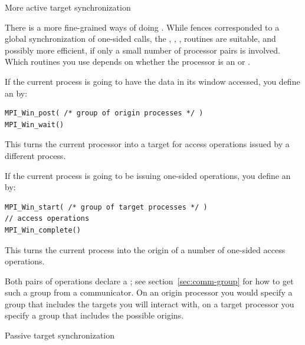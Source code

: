  {More active target synchronization}

There is a more fine-grained ways of doing 
. While fences
corresponded to a global synchronization of one-sided calls,
the ,
, ,  routines
are suitable, and possibly more efficient,
if only a small number of processor pairs is
involved.  Which routines
you use depends on whether the processor is an  or
.

If the current process is going to have the data in its window accessed,
you define an  by:
\begin{verbatim}
MPI_Win_post( /* group of origin processes */ )
MPI_Win_wait()
\end{verbatim}
This turns the current processor into a target for access operations issued
by a different process.

If the current process is going to be issuing one-sided operations,
you define an  by:
\begin{verbatim}
MPI_Win_start( /* group of target processes */ )
// access operations
MPI_Win_complete()
\end{verbatim}
This turns the current process into the origin of a number of
one-sided access operations.

Both pairs of operations declare a
; see section~\ref{sec:comm-group}
for how to get such a group from a communicator.
On an origin processor you would specify a group that includes the targets
you will interact with, on a target processor you specify a group
that includes the possible origins.

 {Passive target synchronization}

